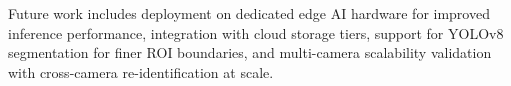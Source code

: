 \documentclass[11pt,a4paper]{article}
\begin{document}
Future work includes deployment on dedicated edge AI hardware for improved inference performance, integration with cloud storage tiers, support for YOLOv8 segmentation for finer ROI boundaries, and multi-camera scalability validation with cross-camera re-identification at scale.




\end{document}
